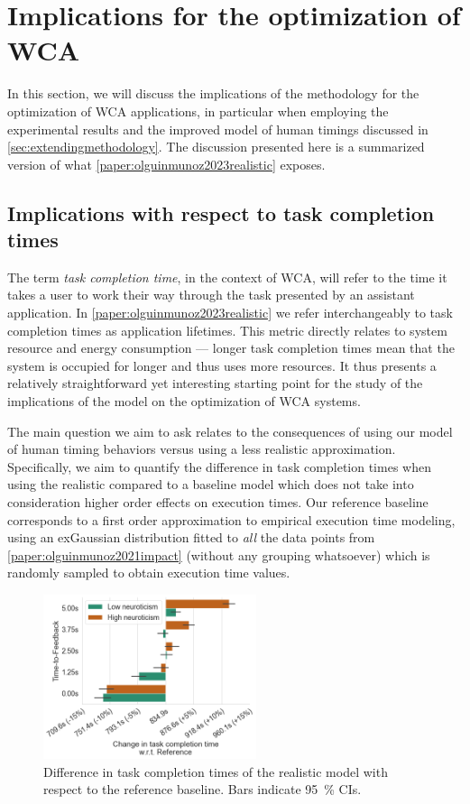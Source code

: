 \section{Implications for the optimization of \acs{WCA}}

In this section, we will discuss the implications of the methodology for the optimization of \gls{WCA} applications, in particular when employing the experimental results and the improved model of human timings discussed in \cref{sec:extendingmethodology}.
The discussion presented here is a summarized version of what \cref{paper:olguinmunoz2023realistic} exposes.


\subsection{Implications with respect to task completion times}

The term \emph{task completion time}, in the context of \gls{WCA}, will refer to the time it takes a user to work their way through the task presented by an assistant application.
In \cref{paper:olguinmunoz2023realistic} we refer interchangeably to task completion times as application lifetimes.
This metric directly relates to system resource and energy consumption --- longer task completion times mean that the system is occupied for longer and thus uses more resources.
It thus presents a relatively straightforward yet interesting starting point for the study of the implications of the model on the optimization of \gls{WCA} systems.

The main question we aim to ask relates to the consequences of using our model of human timing behaviors versus using a less realistic approximation.
Specifically, we aim to quantify the difference in task completion times when using the realistic compared to a baseline model which does not take into consideration higher order effects on execution times.
Our reference baseline corresponds to a first order approximation to empirical execution time modeling, using an \gls{exGaussian} distribution fitted to \emph{all} the data points from \cref{paper:olguinmunoz2021impact} (without any grouping whatsoever) which is randomly sampled to obtain execution time values.

\begin{figure}
    \centering
    \includegraphics[height=13em]{figs/2023EdgeDroid2/task_durations_diff}
    \caption{Difference in task completion times of the realistic model with respect to the reference baseline.
    Bars indicate \SI{95}{\percent} \glspl{CI}.}\label{fig:taskcompletiontimesdiff}
\end{figure}


